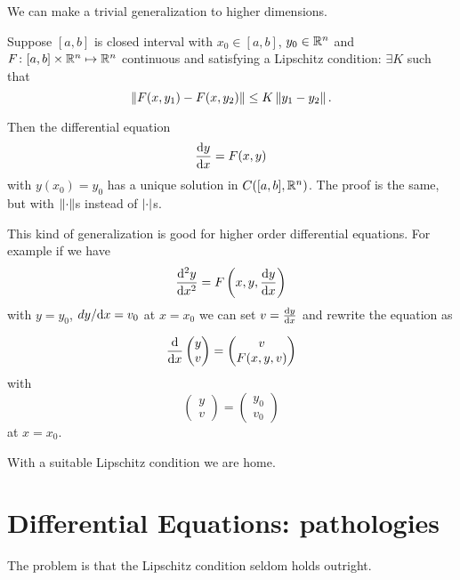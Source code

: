 \documentclass{notes}
\theoremstyle{plain}
\begin{document}
We can make a trivial generalization to higher dimensions.

Suppose $ [a,b] $ is closed interval with $ x_{0} \in [a,b] $, $ 
y_{0} \in \mathbb{R}^{n} $ and $F\colon [a,b] \times \mathbb{R}^{n} \mapsto \mathbb{R}^{n}$ 
continuous and satisfying a Lipschitz condition:  $\exists K $ 
such that
\[
\left\|F(x,y_{1}) -F(x,y_{2}) \right\| \leq K \left\|y_{1}-y_{2}\right\|.
\]

Then the differential equation \[ \frac{\mathrm{d} y}{\mathrm{d} x} = F(x,y) \] with $ 
y(x_0)=y_{0}$ has a unique solution in $C([a,b],\mathbb{R}^n)$.
The proof is the same, but with $\left\|\cdot\right\|$s instead of 
$\left|\cdot\right|$s.

This kind of generalization is good for higher order differential 
equations. For example if we have
\[ \frac{\mathrm{d}^2 y}{\mathrm{d} x^2} = F \left( x,y,  \frac{\mathrm{d} y}{\mathrm{d} x} \right) \] 
with $ y=y_{0} $, $ dy/\mathrm{d} x=v_{0} $ at $ x = x_{0} $ we can
set $ v=\frac{\mathrm{d} y}{\mathrm{d} x}$ and rewrite the equation as

\[ \frac{\mathrm{d}}{\mathrm{d} x} \begin{pmatrix} y \\ v \end{pmatrix} =
\begin{pmatrix} v \\ F(x,y,v) \end{pmatrix} \]
with
\[ \begin{pmatrix} y \\ v \end{pmatrix} = 
\begin{pmatrix} y_{0} \\ v_{0} \end{pmatrix} \] at $ x =x_{0} $.

With a suitable Lipschitz condition we are home.

\section{Differential Equations: pathologies}

The problem is that the Lipschitz condition seldom holds outright.
\end{document}

